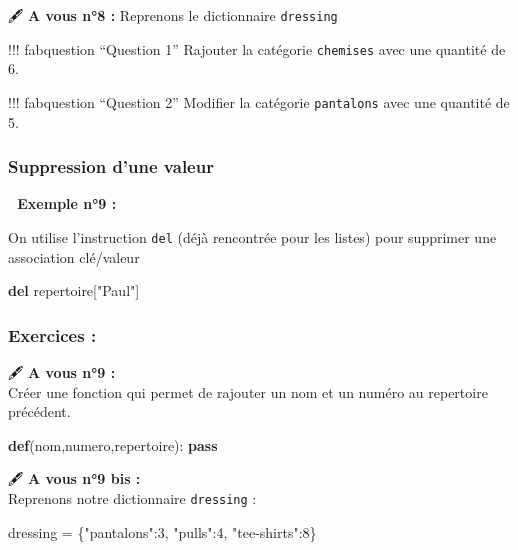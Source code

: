 \documentclass[
]{article}
\newenvironment{Shaded}{}{}
\newcommand{\ControlFlowTok}[1]{\textcolor[rgb]{0.00,0.44,0.13}{\textbf{#1}}}
\newcommand{\DecValTok}[1]{\textcolor[rgb]{0.25,0.63,0.44}{#1}}
\newcommand{\KeywordTok}[1]{\textcolor[rgb]{0.00,0.44,0.13}{\textbf{#1}}}
\newcommand{\NormalTok}[1]{#1}
\newcommand{\OperatorTok}[1]{\textcolor[rgb]{0.40,0.40,0.40}{#1}}
\newcommand{\StringTok}[1]{\textcolor[rgb]{0.25,0.44,0.63}{#1}}
\begin{document}
🖋 \textbf{A vous n°8 :} Reprenons le dictionnaire \texttt{dressing}

!!! fabquestion ``Question 1'' Rajouter la catégorie \texttt{chemises}
avec une quantité de 6.

!!! fabquestion ``Question 2'' Modifier la catégorie \texttt{pantalons}
avec une quantité de 5.

\hypertarget{suppression-dune-valeur}{%
\subsubsection{Suppression d'une valeur}\label{suppression-dune-valeur}}

\textbf{📎 Exemple n°9 :}

On utilise l'instruction \texttt{del} (déjà rencontrée pour les listes)
pour supprimer une association clé/valeur

\begin{Shaded}
\begin{Highlighting}[]
\KeywordTok{del}\NormalTok{ repertoire[}\StringTok{"Paul"}\NormalTok{]}
\end{Highlighting}
\end{Shaded}

\hypertarget{exercices}{%
\subsubsection{Exercices :}\label{exercices}}

🖋 \textbf{A vous n°9 :}\\
Créer une fonction qui permet de rajouter un nom et un numéro au
repertoire précédent.

\begin{Shaded}
\begin{Highlighting}[]
\KeywordTok{def}\NormalTok{(nom,numero,repertoire):}
    \ControlFlowTok{pass}
\end{Highlighting}
\end{Shaded}

🖋 \textbf{A vous n°9 bis :}\\
Reprenons notre dictionnaire \texttt{dressing} :

\begin{Shaded}
\begin{Highlighting}[]
\NormalTok{dressing }\OperatorTok{=}\NormalTok{ \{}\StringTok{"pantalons"}\NormalTok{:}\DecValTok{3}\NormalTok{, }\StringTok{"pulls"}\NormalTok{:}\DecValTok{4}\NormalTok{, }\StringTok{"tee{-}shirts"}\NormalTok{:}\DecValTok{8}\NormalTok{\}}
\end{Highlighting}
\end{Shaded}
\end{document}
